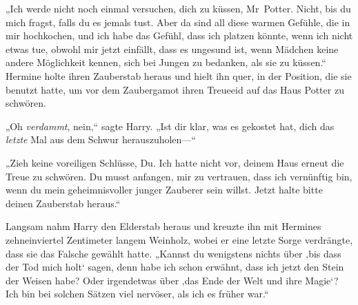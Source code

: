 „Ich werde nicht noch einmal versuchen, dich zu küssen, Mr~Potter. Nicht, bis du mich fragst, falls du es jemals tust. Aber da sind all diese warmen Gefühle, die in mir hochkochen, und ich habe das Gefühl, dass ich platzen könnte, wenn ich nicht etwas tue, obwohl mir jetzt einfällt, dass es ungesund ist, wenn Mädchen keine andere Möglichkeit kennen, sich bei Jungen zu bedanken, als sie zu küssen.“
Hermine holte ihren Zauberstab heraus und hielt ihn quer, in der Position, die sie benutzt hatte, um vor dem Zaubergamot ihren Treueeid auf das Haus Potter zu schwören.

„Oh \emph{verdammt}, nein,“ sagte Harry. „Ist dir klar, was es gekostet hat, dich das \emph{letzte} Mal aus dem Schwur herauszuholen—“

„Zieh keine voreiligen Schlüsse, Du. Ich hatte nicht vor, deinem Haus erneut die Treue zu schwören. Du musst anfangen, mir zu vertrauen, dass ich vernünftig bin, wenn du mein geheimnisvoller junger Zauberer sein willst. Jetzt halte bitte deinen Zauberstab heraus.“

Langsam nahm Harry den Elderstab heraus und kreuzte ihn mit Hermines zehneinviertel Zentimeter langem Weinholz, wobei er eine letzte Sorge verdrängte, dass sie das Falsche gewählt hatte.
„Kannst du wenigstens nichts über ‚bis dass der Tod mich holt‘ sagen, denn habe ich schon erwähnt, dass ich jetzt den Stein der Weisen habe? Oder irgendetwas über ‚das Ende der Welt und ihre Magie‘? Ich bin bei solchen Sätzen viel nervöser, als ich es früher war.“

